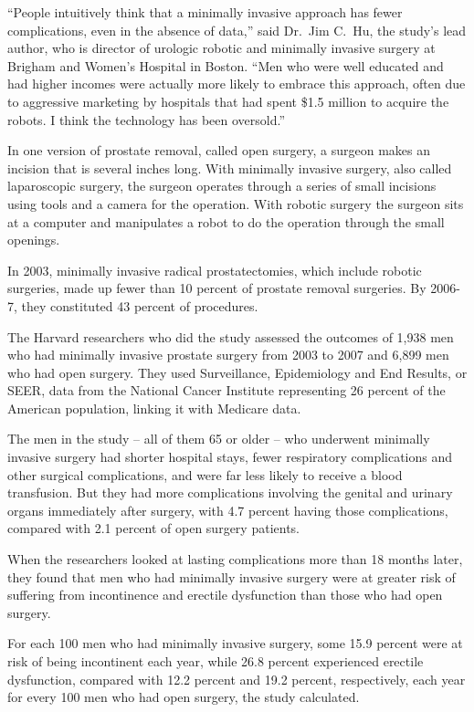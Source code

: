 ﻿\documentclass[12pt]{article}
\begin{document}
``People intuitively think that a minimally invasive approach has fewer complications, even in the
absence of data,'' said Dr.~Jim C.~Hu, the study's lead author, who is director of urologic robotic
and minimally invasive surgery at Brigham and Women's Hospital in Boston. ``Men who were well
educated and had higher incomes were actually more likely to embrace this approach, often due to
aggressive marketing by hospitals that had spent \$1.5 million to acquire the robots. I think the
technology has been oversold.''

In one version of prostate removal, called open surgery, a surgeon makes an incision that is several
inches long. With minimally invasive surgery, also called laparoscopic surgery, the surgeon operates
through a series of small incisions using tools and a camera for the operation. With robotic surgery
the surgeon sits at a computer and manipulates a robot to do the operation through the small
openings.

In 2003, minimally invasive radical prostatectomies, which include robotic surgeries, made up fewer
than 10 percent of prostate removal surgeries. By 2006-7, they constituted 43 percent of procedures.

The Harvard researchers who did the study assessed the outcomes of 1,938 men who had minimally
invasive prostate surgery from 2003 to 2007 and 6,899 men who had open surgery. They used
Surveillance, Epidemiology and End Results, or SEER, data from the National Cancer Institute
representing 26 percent of the American population, linking it with Medicare data.

The men in the study -- all of them 65 or older -- who underwent minimally invasive surgery had
shorter hospital stays, fewer respiratory complications and other surgical complications, and were
far less likely to receive a blood transfusion. But they had more complications involving the
genital and urinary organs immediately after surgery, with 4.7 percent having those complications,
compared with 2.1 percent of open surgery patients.

When the researchers looked at lasting complications more than 18 months later, they found that men
who had minimally invasive surgery were at greater risk of suffering from incontinence and erectile
dysfunction than those who had open surgery.

For each 100 men who had minimally invasive surgery, some 15.9 percent were at risk of being
incontinent each year, while 26.8 percent experienced erectile dysfunction, compared with 12.2
percent and 19.2 percent, respectively, each year for every 100 men who had open surgery, the study
calculated.
\end{document}
